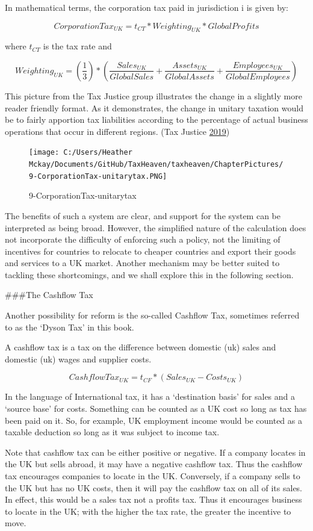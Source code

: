 \documentclass[]{tufte-handout}
\begin{document}
In mathematical terms, the corporation tax paid in jurisdiction i is
given by:

\[CorporationTax_{UK} = t_{CT} * Weighting_{UK} * Global Profits\]

where \(t_{CT}\) is the tax rate and

\[  Weighting_{UK} = \left( \frac{1}{3} \right)* \left( \frac{Sales_{UK}}{Global Sales} + \frac{Assets_{UK}}{Global Assets} + \frac{Employees_{UK}}{GlobalEmployees} \right)\]

This picture from the Tax Justice group illustrates the change in a
slightly more reader friendly format. As it demonstrates, the change in
unitary taxation would be to fairly apportion tax liabilities according
to the percentage of actual business operations that occur in different
regions. (Tax Justice \protect\hyperlink{ref-TaxJustice2019}{2019})

\begin{figure}
\centering
\texttt{[image: C:/Users/Heather Mckay/Documents/GitHub/TaxHeaven/taxheaven/ChapterPictures/9-CorporationTax-unitarytax.PNG]}
\caption{9-CorporationTax-unitarytax}
\end{figure}

The benefits of such a system are clear, and support for the system can
be interpreted as being broad. However, the simplified nature of the
calculation does not incorporate the difficulty of enforcing such a
policy, not the limiting of incentives for countries to relocate to
cheaper countries and export their goods and services to a UK market.
Another mechanism may be better suited to tackling these shortcomings,
and we shall explore this in the following section.

\#\#\#The Cashflow Tax

Another possibility for reform is the so-called Cashflow Tax, sometimes
referred to as the `Dyson Tax' in this book.

A cashflow tax is a tax on the difference between domestic (uk) sales
and domestic (uk) wages and supplier costs.

\[Cashflow Tax_{UK} = t_{CF} * (Sales_{UK} - Costs_{UK})\]

In the language of International tax, it has a `destination basis' for
sales and a `source base' for costs. Something can be counted as a UK
cost so long as tax has been paid on it. So, for example, UK employment
income would be counted as a taxable deduction so long as it was subject
to income tax.

Note that cashflow tax can be either positive or negative. If a company
locates in the UK but sells abroad, it may have a negative cashflow tax.
Thus the cashflow tax encourages companies to locate in the UK.
Conversely, if a company sells to the UK but has no UK costs, then it
will pay the cashflow tax on all of its sales. In effect, this would be
a sales tax not a profits tax. Thus it encourages business to locate in
the UK; with the higher the tax rate, the greater the incentive to move.
\end{document}
